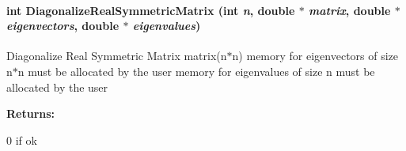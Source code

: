 \paragraph{\setlength{\rightskip}{0pt plus 5cm}int Diagonalize\-Real\-Symmetric\-Matrix (int {\em n}, double $\ast$ {\em matrix}, double $\ast$ {\em eigenvectors}, double $\ast$ {\em eigenvalues})}\hfill\label{vutils_h_a0}


Diagonalize Real Symmetric Matrix matrix(n$\ast$n)  memory for eigenvectors of size n$\ast$n must be allocated by the user memory for eigenvalues of size n must be allocated by the user \begin{Desc}
\item[{\bf Returns: }]\par
0 if ok \end{Desc}
